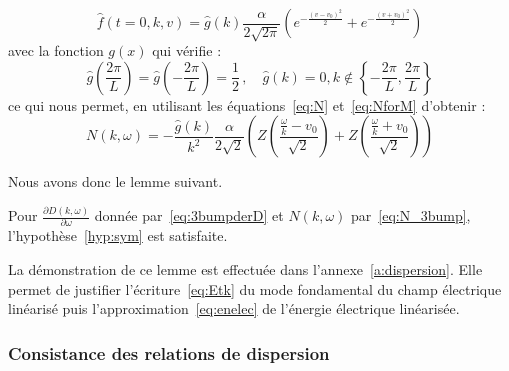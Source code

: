 $$
  \hat{f}(t=0,k,v) = \hat{g}(k) \frac{\alpha}{2\sqrt{2\pi}}\left( e^{-\frac{(v-v_0)^2}{2}} + e^{-\frac{(v+v_0)^2}{2}} \right) 
$$
avec la fonction $g(x)$ qui vérifie :
$$ 
  \hat{g}\left(\frac{2\pi}{L}\right) = \hat{g}\left(-\frac{2\pi}{L}\right) = \frac{1}{2}\,,\quad \hat{g}(k) = 0, k\notin\left\{-\frac{2\pi}{L} ,\frac{2\pi}{L} \right\}
$$
ce qui nous permet, en utilisant les équations~\eqref{eq:N} et~\eqref{eq:NforM} d'obtenir :
\begin{equation}
  N(k,\omega) = -\frac{\hat{g}(k)}{k^2}\frac{\alpha}{2\sqrt{2}}\left( Z\left(\frac{\frac{\omega}{k}-v_0}{\sqrt{2}}\right) + Z\left(\frac{\frac{\omega}{k}+v_0}{\sqrt{2}}\right) \right)
  \label{eq:N_3bump}
\end{equation}

Nous avons donc le lemme suivant.
\begin{lemma}
  Pour $\frac{\partial D(k,\omega)}{\partial\omega}$ donnée par~\eqref{eq:3bumpderD} et $N(k,\omega)$ par~\eqref{eq:N_3bump}, l'hypothèse~\ref{hyp:sym} est satisfaite.
  \label{lemme:hypcascin}
\end{lemma}

La démonstration de ce lemme est effectuée dans l'annexe~\ref{a:dispersion}. Elle permet de justifier l'écriture~\eqref{eq:Etk} du mode fondamental du champ électrique linéarisé puis l'approximation~\eqref{eq:enelec} de l'énergie électrique linéarisée. 

\subsubsection{Consistance des relations de dispersion}


